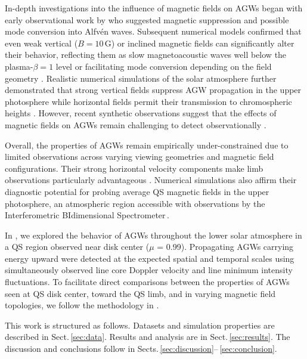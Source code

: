 \documentclass[preprint2,linenumbers]{aastex701}
\begin{document}
In-depth investigations into the influence of magnetic fields on AGWs began with early observational work by \citet{2008_Straus_Fleck_Jeffries_etal} who suggested magnetic suppression and possible mode conversion into Alfv\'{e}n waves.
Subsequent numerical models confirmed that even weak vertical ($B = 10$\,G) or inclined magnetic fields can significantly alter their behavior, reflecting them as slow magnetoacoustic waves well below the plasma-$\beta=1$ level or facilitating mode conversion depending on the field geometry \citep{2009_Newington_Cally, 2011_Newington_Cally, 2016_Hague_Erdelyi}.
Realistic numerical simulations of the solar atmosphere further demonstrated that strong vertical fields suppress AGW propagation in the upper photosphere while horizontal fields permit their transmission to chromospheric heights \citep{2017_Vigeesh, 2019_Vigeesh_Roth_Steiner_Jackiewicz, 2021_Vigeesh_Roth_Steiner_Fleck}.
However, recent synthetic observations suggest that the effects of magnetic fields on AGWs remain challenging to detect observationally \citep{2020_Vigeesh_Roth}.

Overall, the properties of AGWs remain empirically under-constrained due to limited observations across varying viewing geometries and magnetic field configurations. 
Their strong horizontal velocity components make limb observations particularly advantageous \citep{1981_Mihalas_Toomre}.
Numerical simulations also affirm their diagnostic potential for probing average QS magnetic fields in the upper photosphere, an atmospheric region accessible with observations by the Interferometric BIdimensional Spectrometer\,\citep[IBIS;][]{Cavallini_IBIS}.

In \citet[][hereafter ]{2023_Vesa}, we explored the behavior of AGWs throughout the lower solar atmosphere in a QS region observed near disk center ($\mu$ = 0.99).
Propagating AGWs carrying energy upward were detected at the expected spatial and temporal scales using simultaneously observed line core Doppler velocity and line minimum intensity fluctuations.
To facilitate direct comparisons between the properties of AGWs seen at QS disk center, toward the QS limb, and in varying magnetic field topologies, we follow the methodology in .


This work is structured as follows.
Datasets and simulation properties are described in Sect.\,\ref{sec:data}.
Results and analysis are in Sect.\,\ref{sec:results}.
The discussion and conclusions follow in Sects.\,\ref{sec:discussion}--\,\ref{sec:conclusion}.
\end{document}
